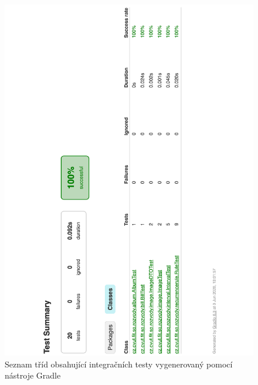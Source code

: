     \begin{figure}\centering
	    \includegraphics[width=1.0\textwidth]{pdfs/Gradle-integration-tests}
	    \caption[Seznam tříd obsahujících integrační testy]{Seznam tříd obsahující integračních testy vygenerovaný pomocí nástroje Gradle}\label{image:gradle-integration-tests}
    \end{figure}
